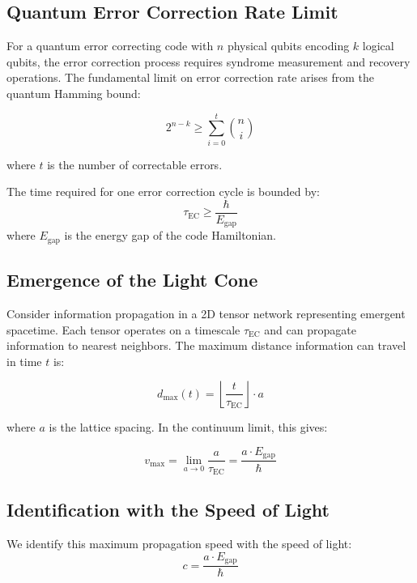 \documentclass[12pt]{article}
\begin{document}
\subsection{Quantum Error Correction Rate Limit}

For a quantum error correcting code with $n$ physical qubits encoding $k$ logical qubits, the error correction process requires syndrome measurement and recovery operations. The fundamental limit on error correction rate arises from the quantum Hamming bound:

\begin{equation}
2^{n-k} \geq \sum_{i=0}^t \binom{n}{i}
\end{equation}

where $t$ is the number of correctable errors.

The time required for one error correction cycle is bounded by:
\begin{equation}
\tau_{\text{EC}} \geq \frac{\hbar}{E_{\text{gap}}}
\end{equation}
where $E_{\text{gap}}$ is the energy gap of the code Hamiltonian.

\subsection{Emergence of the Light Cone}

Consider information propagation in a 2D tensor network representing emergent spacetime. Each tensor operates on a timescale $\tau_{\text{EC}}$ and can propagate information to nearest neighbors. The maximum distance information can travel in time $t$ is:

\begin{equation}
d_{\max}(t) = \left\lfloor \frac{t}{\tau_{\text{EC}}} \right\rfloor \cdot a
\end{equation}

where $a$ is the lattice spacing. In the continuum limit, this gives:

\begin{equation}
v_{\max} = \lim_{a \rightarrow 0} \frac{a}{\tau_{\text{EC}}} = \frac{a \cdot E_{\text{gap}}}{\hbar}
\end{equation}

\subsection{Identification with the Speed of Light}

We identify this maximum propagation speed with the speed of light:
\begin{equation}
c = \frac{a \cdot E_{\text{gap}}}{\hbar}
\end{equation}
\end{document}

